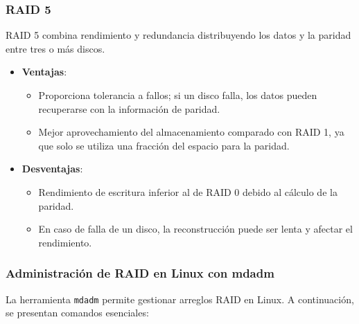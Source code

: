 \subsubsection{RAID 5}

RAID 5 combina rendimiento y redundancia distribuyendo los datos y la paridad entre tres o más discos.

\begin{itemize}
  \item \textbf{Ventajas}:
    \begin{itemize}
      \item Proporciona tolerancia a fallos; si un disco falla, los datos pueden recuperarse con la información de paridad.
      \item Mejor aprovechamiento del almacenamiento comparado con RAID 1, ya que solo se utiliza una fracción del espacio para la paridad.
    \end{itemize}
  \item \textbf{Desventajas}:
    \begin{itemize}
      \item Rendimiento de escritura inferior al de RAID 0 debido al cálculo de la paridad.
      \item En caso de falla de un disco, la reconstrucción puede ser lenta y afectar el rendimiento.
    \end{itemize}
\end{itemize}

\subsubsection{Administración de RAID en Linux con mdadm}

La herramienta \texttt{mdadm} permite gestionar arreglos RAID en Linux. A continuación, se presentan comandos esenciales:

